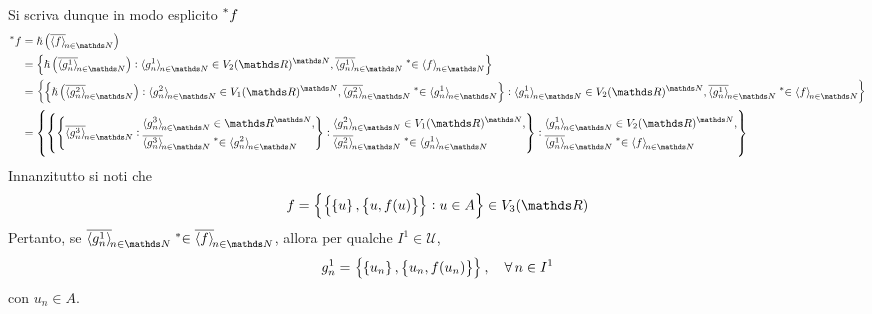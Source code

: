 {\begin{enumerate}
        Si scriva dunque in modo esplicito $ \prescript{*}{}{f} ${\small\begin{align}
            \nonstandard{f} &= \hslash \left(\filtersequence{f}\right)\notag\\ 
            &= \set{\hslash\left(\filtersequence{g^{1}_n}\right): \sequence{g^{1}_n} \in V_{2}(\R)^{\N}, \filtersequence{g^{1}_n}\mathrel{\nonstandard{\in}}\sequence{f} }\notag\\ 
            &= \set{\set{\hslash\left(\filtersequence{g^{2}_n}\right): \sequence{g^{2}_n} \in V_{1}(\R)^{\N}, \filtersequence{g^{2}_n}\mathrel{\nonstandard{\in}}\sequence{g^{1}_n}}: \sequence{g^{1}_n} \in V_{2}(\R)^{\N}, \filtersequence{g^{1}_n}\mathrel{\nonstandard{\in}}\sequence{f} }\notag\\ 
            &=%
            \set{%
                \set{
                    \set{
                        \filtersequence{g^{3}_n}: 
                            \begin{aligned}
                                \sequence{g^{3}_n} &\in \R^{\N},\\ \filtersequence{g^{3}_n}&\mathrel{\nonstandard{\in}}\sequence{g^2_n}
                            \end{aligned}
                    }: 
                    \begin{aligned}
                        \sequence{g^{2}_n} &\in V_{1}(\R)^{\N},\\ \filtersequence{g^{2}_n}&\mathrel{\nonstandard{\in}}\sequence{g^{1}_n}
                    \end{aligned}
                }: 
                \begin{aligned}
                    \sequence{g^{1}_n} &\in V_{2}(\R)^{\N},\\ \filtersequence{g^{1}_n}&\mathrel{\nonstandard{\in}}\sequence{f} 
                \end{aligned}
            }\label{eq:funzione}
        \end{align}}Innanzitutto si noti che \begin{equation*}
            f = \set{\set{\set{u},\set{u,f(u)}}: u \in A} \in V_3(\R)
        \end{equation*}Pertanto, se $ \filtersequence{g_{n}^{1}} \mathrel{\nonstandard{\in}} \filtersequence{f} $, allora per qualche $ I^{1} \in \mathcal{U} $, \begin{equation*}
            g_{n}^{1} =  \set{\set{u_{n} },\set{u_{n} ,f(u_{n} )}},\quad \forall\, n \in I^{1}
        \end{equation*}con $ u_{n} \in A  $.
        

\end{enumerate}}
